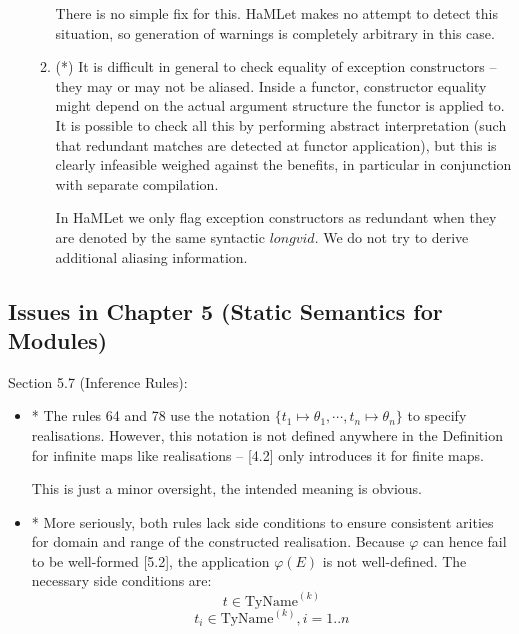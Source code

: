 \documentclass[twoside,titlepage]{article}
\begin{document}
\begin{appendix}
\begin{itemize}
\begin{enumerate}
There is no simple fix for this. HaMLet makes no attempt to detect this situation, so generation of warnings is completely arbitrary in this case.

\item (*) It is difficult in general to check equality of exception constructors -- they may or may not be aliased. Inside a functor, constructor equality might depend on the actual argument structure the functor is applied to. It is possible to check all this by performing abstract interpretation (such that redundant matches are detected at functor application), but this is clearly infeasible weighed against the benefits, in particular in conjunction with separate compilation.

In HaMLet we only flag exception constructors as redundant when they are denoted by the same syntactic $\mathit{longvid}$. We do not try to derive additional aliasing information.

\end{enumerate}

\end{itemize}


\subsection{Issues in Chapter 5 (Static Semantics for Modules)}
\label{bugschapter5}

Section 5.7 (Inference Rules):

\begin{itemize}
\item * The rules 64 and 78 use the notation $\{t_1\mapsto\theta_1,\cdots,t_n\mapsto\theta_n\}$ to specify realisations. However, this notation is not defined anywhere in the Definition for infinite maps like realisations -- [4.2] only introduces it for finite maps.

This is just a minor oversight, the intended meaning is obvious.

\item * More seriously, both rules lack side conditions to ensure consistent arities for domain and range of the constructed realisation. Because $\varphi$ can hence fail to be well-formed [5.2], the application $\varphi(E)$ is not well-defined. The necessary side conditions are:
\setcounter{equation}{63}
\begin{equation}
t \in \mbox{TyName}^{(k)}
\end{equation}
\setcounter{equation}{77}
\begin{equation}
t_i \in \mbox{TyName}^{(k)}, i = 1..n
\end{equation}


\end{itemize}
\end{appendix}
\end{document}

